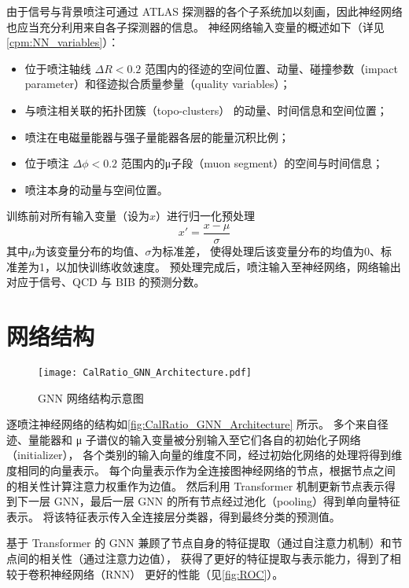 由于信号与背景喷注可通过 ATLAS 探测器的各个子系统加以刻画，因此神经网络也应当充分利用来自各子探测器的信息。
神经网络输入变量的概述如下（详见\autoref{cpm:NN_variables}）：
\begin{itemize}
    \item 位于喷注轴线 $\Delta R < 0.2$ 范围内的径迹的空间位置、动量、碰撞参数（impact parameter）和径迹拟合质量参量（quality variables）；
    \item 与喷注相关联的拓扑团簇（topo-clusters） 的动量、时间信息和空间位置；
    \item 喷注在电磁量能器与强子量能器各层的能量沉积比例；
    \item 位于喷注 $\Delta \phi < 0.2$ 范围内的μ子段（muon segment）的空间与时间信息；
    \item 喷注本身的动量与空间位置。
\end{itemize}

训练前对所有输入变量（设为$x$）进行归一化预处理
\begin{equation}
    x' = \frac{x-\mu}{\sigma}
\end{equation}
其中$\mu$为该变量分布的均值、$\sigma$为标准差，
使得处理后该变量分布的均值为0、标准差为1，以加快训练收敛速度。
预处理完成后，喷注输入至神经网络，网络输出对应于信号、QCD 与 BIB 的预测分数。


\section{网络结构}
\begin{figure}[ht]
    \centering
    \texttt{[image: CalRatio\_GNN\_Architecture.pdf]}
    \caption{GNN 网络结构示意图}
    \label{fig:CalRatio_GNN_Architecture}
\end{figure}

逐喷注神经网络的结构如\autoref{fig:CalRatio_GNN_Architecture} 所示。
多个来自径迹、量能器和 μ 子谱仪的输入变量被分别输入至它们各自的初始化子网络（initializer），
各个类别的输入向量的维度不同，经过初始化网络的处理将得到维度相同的向量表示。
每个向量表示作为全连接图神经网络的节点，根据节点之间的相关性计算注意力权重作为边值。
然后利用 Transformer 机制更新节点表示得到下一层 GNN，最后一层 GNN 的所有节点经过池化（pooling）得到单向量特征表示。
将该特征表示传入全连接层分类器，得到最终分类的预测值。

基于 Transformer 的 GNN 兼顾了节点自身的特征提取（通过自注意力机制）和节点间的相关性（通过注意力边值），
获得了更好的特征提取与表示能力，得到了相较于卷积神经网络（RNN）\cite{ATLAS:2022zhj} 更好的性能（见\autoref{fig:ROC}）。


